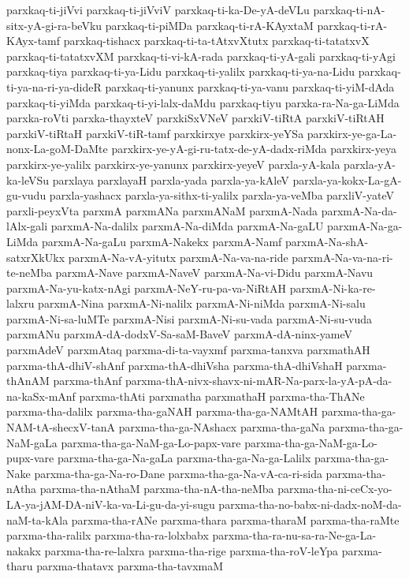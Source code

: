 {parxkaq-ti-jiVvi
parxkaq-ti-jiVviV
parxkaq-ti-ka-De-yA-deVLu
parxkaq-ti-nA-sitx-yA-gi-ra-beVku
parxkaq-ti-piMDa
parxkaq-ti-rA-KAyxtaM
parxkaq-ti-rA-KAyx-tamf
parxkaq-tishacx
parxkaq-ti-ta-tAtxvXtutx
parxkaq-ti-tatatxvX
parxkaq-ti-tatatxvXM
parxkaq-ti-vi-kA-rada
parxkaq-ti-yA-gali
parxkaq-ti-yAgi
parxkaq-tiya
parxkaq-ti-ya-Lidu
parxkaq-ti-yalilx
parxkaq-ti-ya-na-Lidu
parxkaq-ti-ya-na-ri-ya-dideR
parxkaq-ti-yanunx
parxkaq-ti-ya-vanu
parxkaq-ti-yiM-dAda
parxkaq-ti-yiMda
parxkaq-ti-yi-lalx-daMdu
parxkaq-tiyu
parxka-ra-Na-ga-LiMda
parxka-roVti
parxka-thayxteV
parxkiSxVNeV
parxkiV-tiRtA
parxkiV-tiRtAH
parxkiV-tiRtaH
parxkiV-tiR-tamf
parxkirxye
parxkirx-yeYSa
parxkirx-ye-ga-La-nonx-La-goM-DaMte
parxkirx-ye-yA-gi-ru-tatx-de-yA-dadx-riMda
parxkirx-yeya
parxkirx-ye-yalilx
parxkirx-ye-yanunx
parxkirx-yeyeV
parxla-yA-kala
parxla-yA-ka-leVSu
parxlaya
parxlayaH
parxla-yada
parxla-ya-kAleV
parxla-ya-kokx-La-gA-gu-vudu
parxla-yashacx
parxla-ya-sithx-ti-yalilx
parxla-ya-veMba
parxliV-yateV
parxli-peyxVta
parxmA
parxmANa
parxmANaM
parxmA-Nada
parxmA-Na-da-lAlx-gali
parxmA-Na-dalilx
parxmA-Na-diMda
parxmA-Na-gaLU
parxmA-Na-ga-LiMda
parxmA-Na-gaLu
parxmA-Nakekx
parxmA-Namf
parxmA-Na-shA-satxrXkUkx
parxmA-Na-vA-yitutx
parxmA-Na-va-na-ride
parxmA-Na-va-na-ri-te-neMba
parxmA-Nave
parxmA-NaveV
parxmA-Na-vi-Didu
parxmA-Navu
parxmA-Na-yu-katx-nAgi
parxmA-NeY-ru-pa-va-NiRtAH
parxmA-Ni-ka-re-lalxru
parxmA-Nina
parxmA-Ni-nalilx
parxmA-Ni-niMda
parxmA-Ni-salu
parxmA-Ni-sa-luMTe
parxmA-Nisi
parxmA-Ni-su-vada
parxmA-Ni-su-vuda
parxmANu
parxmA-dA-dodxV-Sa-saM-BaveV
parxmA-dA-ninx-yameV
parxmAdeV
parxmAtaq
parxma-di-ta-vayxmf
parxma-tanxva
parxmathAH
parxma-thA-dhiV-shAnf
parxma-thA-dhiVsha
parxma-thA-dhiVshaH
parxma-thAnAM
parxma-thAnf
parxma-thA-nivx-shavx-ni-mAR-Na-parx-la-yA-pA-da-na-kaSx-mAnf
parxma-thAti
parxmatha
parxmathaH
parxma-tha-ThANe
parxma-tha-dalilx
parxma-tha-gaNAH
parxma-tha-ga-NAMtAH
parxma-tha-ga-NAM-tA-shecxV-tanA
parxma-tha-ga-NAshacx
parxma-tha-gaNa
parxma-tha-ga-NaM-gaLa
parxma-tha-ga-NaM-ga-Lo-papx-vare
parxma-tha-ga-NaM-ga-Lo-pupx-vare
parxma-tha-ga-Na-gaLa
parxma-tha-ga-Na-ga-Lalilx
parxma-tha-ga-Nake
parxma-tha-ga-Na-ro-Dane
parxma-tha-ga-Na-vA-ca-ri-sida
parxma-tha-nAtha
parxma-tha-nAthaM
parxma-tha-nA-tha-neMba
parxma-tha-ni-ceCx-yo-LA-ya-jAM-DA-niV-ka-va-Li-gu-da-yi-sugu
parxma-tha-no-babx-ni-dadx-noM-da-naM-ta-kAla
parxma-tha-rANe
parxma-thara
parxma-tharaM
parxma-tha-raMte
parxma-tha-ralilx
parxma-tha-ra-lolxbabx
parxma-tha-ra-nu-sa-ra-Ne-ga-La-nakakx
parxma-tha-re-lalxra
parxma-tha-rige
parxma-tha-roV-leYpa
parxma-tharu
parxma-thatavx
parxma-tha-tavxmaM
}
